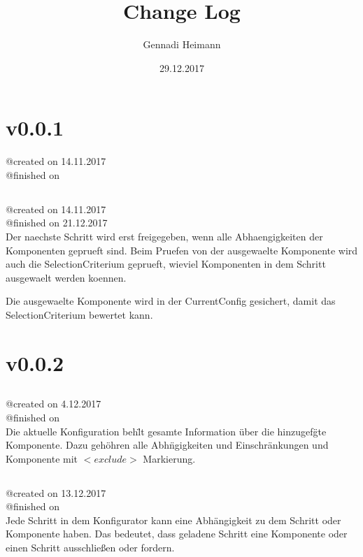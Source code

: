 \documentclass{article}
\begin{document}
\begin{titlepage}
\author{Gennadi Heimann} 
\title{Change Log} 
\date{29.12.2017} 
\maketitle
\end{titlepage}

\section{v0.0.1}
@created on 14.11.2017\\
@finished on \\

\subsection{}
@created on     14.11.2017\\
@finished on   21.12.2017\\

Der naechste Schritt wird erst freigegeben, wenn alle Abhaengigkeiten 
der Komponenten geprueft sind. Beim Pruefen von der ausgewaelte 
Komponente wird auch die SelectionCriterium geprueft, wieviel Komponenten 
in dem Schritt ausgewaelt werden koennen.

Die ausgewaelte Komponente wird in der CurrentConfig gesichert, damit das
SelectionCriterium bewertet kann.\\

\section{v0.0.2}

\subsection{}
@created on     4.12.2017\\
@finished on   \\

Die aktuelle Konfiguration beh\"lt gesamte Information \"uber die hinzugef\"gte
Komponente. Dazu geh\"ohren alle Abh\"ngigkeiten und Einschr\"ankungen und
Komponente mit $<exclude>$ Markierung.\\

\subsection{}
@created on 13.12.2017\\
@finished on \\
Jede Schritt in dem Konfigurator kann eine Abh\"angigkeit zu dem Schritt oder
Komponente haben. Das bedeutet, dass geladene Schritt eine Komponente oder einen
Schritt ausschlie\ss{}en oder fordern.\\
\end{document}
